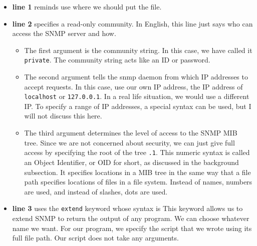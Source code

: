 \documentclass{article}
\begin{document}
\begin{itemize}[leftmargin=*]
	
	\item

		\textbf{line 1} reminds use where we should put the file.

	\item

		\textbf{line 2} specifies a read-only community. In English,
		this line just says who can access the SNMP server and how.

		\begin{itemize}

			\item

				The first argument is the community string. In
				this case, we have called it \verb|private|. The
				community string acts like an ID or password.

			\item

				The second argument tells the snmp daemon from
				which IP addresses to accept requests. In this
				case, use our own IP address, the IP address of
				\verb|localhost| or \verb|127.0.0.1|.  In a real
				life situation, we would use a different IP. To
				specify a range of IP addresses, a special
				syntax can be used, but I will not discuss this
				here.

			\item

				The third argument determines the level of
				access to the SNMP MIB tree. Since we are not
				concerned about security, we can just give full
				access by specifying the root of the tree
				\verb|.1|. This numeric syntax is called an
				Object Identifier, or OID for short, as
				discussed in the background subsection.  It
				specifies locations in a MIB tree in the same
				way that a file path specifies locations of
				files in a file system. Instead of names,
				numbers are used, and instead of slashes, dots
				are used.

		\end{itemize}

	\item

		\textbf{line 3} uses the \verb|extend| keyword whose syntax is
		 This keyword allows
		us to extend SNMP to return the output of any program.  We can
		choose whatever name we want. For our program, we specify the
		script that we wrote using its full file path. Our script does
		not take any arguments.

\end{itemize}
\end{document}
